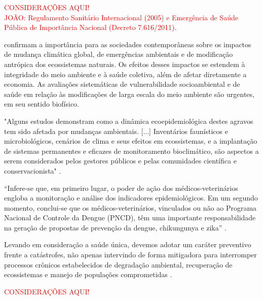\begin{center}
\textcolor{red}{CONSIDERAÇÕES AQUI!}\\ 
\textcolor{red}{JOÃO: Regulamento Sanitário Internacional (2005) e Emergência de Saúde Pública de Importância Nacional (Decreto 7.616/2011).}
\end{center}

\indent {} confirmam a importância para as sociedades contemporâneas sobre os impactos de mudança climática global, de emergências ambientais e de modificação antrópica dos ecossistemas naturais. Os efeitos desses impactos se estendem à integridade do meio ambiente e à saúde coletiva, além de afetar diretamente a economia. As avaliações sistemáticas de vulnerabilidade socioambiental e de saúde em relação às modificações de larga escala do meio ambiente são urgentes, em seu sentido biofísico. 

\begin{citacao}
"Alguns estudos demonstram como a dinâmica ecoepidemiológica destes agravos tem sido afetada por mudanças ambientais. [...] Inventários faunísticos e microbiológicos, cenários de clima e seus efeitos em ecossistemas, e a implantação de sistemas permanentes e eficazes de monitoramento bioclimático, são aspectos a serem considerados pelos gestores públicos e pelas comunidades científica e conservacionista" \cite[pg-2325]{Cubas2014Tratado}.
\end{citacao}

\begin{citacao}
“Infere-se que, em primeiro lugar, o poder de ação dos médicos-veterinários engloba a monitoração e análise dos indicadores epidemiológicos. Em um segundo momento, conclui-se que os médicos-veterinários, vinculados ou não ao Programa Nacional de Controle da Dengue (PNCD), têm uma importante responsabilidade na geração de propostas de prevenção da dengue, chikungunya e zika” \cite[pg-12]{Silva2016O}.
\end{citacao}

\indent Levando em consideração a saúde única, devemos adotar um caráter preventivo frente a catástrofes, não apenas  intervindo de forma mitigadora para interromper processos crônicos estabelecidos de degradação ambiental, recuperação de ecossistemas e manejo de populações comprometidas \cite{Cubas2014Tratado}.
\begin{center}
\textcolor{red}{CONSIDERAÇÕES AQUI!}\\ 
\end{center}




